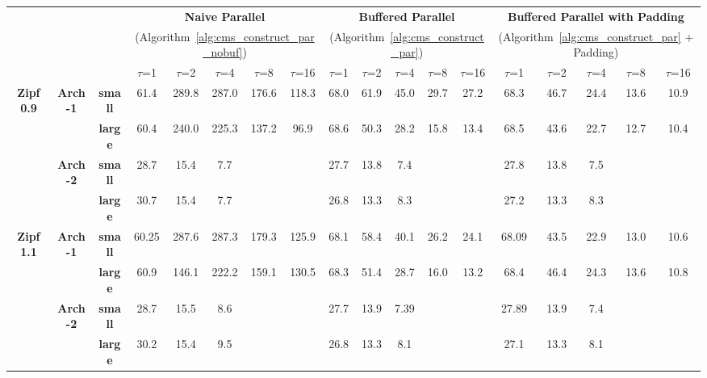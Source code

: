 \documentclass[10pt, conference, compsocconf]{IEEEtran}
\begin{document}
\begin{table}[]
\centering

{\def\arraystretch{1.3}
\begin{tabular}{ccc||ccccc|ccccc|ccccc}
                                   &&                 & \multicolumn{5}{c|}{\textbf{Naive Parallel}} & \multicolumn{5}{c|}{\textbf{Buffered Parallel}} & \multicolumn{5}{c}{\textbf{Buffered Parallel with Padding}} \\
                                                                      &&                 & \multicolumn{5}{c|}{(Algorithm~\ref{alg:cms_construct_par_nobuf})} & \multicolumn{5}{c|}{(Algorithm~\ref{alg:cms_construct_par})} & \multicolumn{5}{c}{(Algorithm~\ref{alg:cms_construct_par} + Padding)} \\

                                   &&                 & $\tau$=1   & $\tau$=2    & $\tau$=4    & $\tau$=8    & $\tau$=16  & $\tau$=1   & $\tau$=2   & $\tau$=4   & $\tau$=8   & $\tau$=16  & $\tau$=1   & $\tau$=2   & $\tau$=4   & $\tau$=8   & $\tau$=16 \\ \hline
\multicolumn{1}{c}{\multirow{4}{*}{\textbf{Zipf 0.9}}} 
&\multirow{2}{*}{\textbf{Arch-1}} & \textbf{small}  & 61.4  & 289.8  & 287.0  & 176.6  & 118.3 & 68.0  & 61.9  & 45.0  & 29.7  & 27.2  & 68.3  & 46.7  & 24.4    & 13.6  & 10.9 \\
                                   && \textbf{large} & 60.4  & 240.0  & 225.3  & 137.2  & 96.9  & 68.6  & 50.3  & 28.2  & 15.8& 13.4&68.5&43.6&22.7&12.7& 10.4 \\ \cline{2-18}
&\multirow{2}{*}{\textbf{Arch-2}}  & \textbf{small}  & 28.7  & 15.4   & 7.7   &        &       & 27.7  & 13.8  & 7.4  &       &       & 27.8  & 13.8  & 7.5  &       &      \\
                                   && \textbf{large} & 30.7  & 15.4   & 7.7   &        &       & 26.8  & 13.3  & 8.3  &       &       & 27.2  & 13.3  & 8.3  &       &  \\ \hline 
 
\multicolumn{1}{c}{\multirow{4}{*}{\textbf{Zipf 1.1}}} 
&\multirow{2}{*}{\textbf{Arch-1}} & \textbf{small}  & 60.25  & 287.6  & 287.3  & 179.3  & 125.9 & 68.1  & 58.4  & 40.1  & 26.2  & 24.1  & 68.09  & 43.5  & 22.9    & 13.0  & 10.6 \\
&& \textbf{large} & 60.9  & 146.1  & 222.2  & 159.1  & 130.5  & 68.3  & 51.4  & 28.7  & 16.0& 13.2&68.4&46.4&24.3&13.6& 10.8 \\ \cline{2-18}
&\multirow{2}{*}{\textbf{Arch-2}}  & \textbf{small}  & 28.7  & 15.5   & 8.6   &        &       & 27.7  & 13.9  & 7.39  &       &       & 27.89  & 13.9  & 7.4  &       &      \\
&& \textbf{large} & 30.2 & 15.4   & 9.5   &        &       & 26.8  & 13.3  & 8.1  &       &       & 27.1  & 13.3  & 8.1  &       &  \\ \hline 


\end{tabular}}
\end{table}
\end{document}
